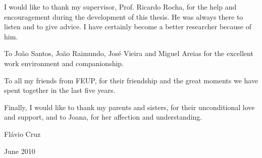 I would like to thank my supervisor, Prof. Ricardo Rocha, for the help and encouragement during
the development of this thesis. He was always there to listen and to give advice. I have
certainly become a better researcher because of him.

To João Santos, João Raimundo, José Vieira and Miguel Areias for the excellent work environment
and companionship.

To all my friends from FEUP, for their friendship and the great moments we have spent together in
the last five years. 

Finally, I would like to thank my parents and sisters, for their unconditional love and support,
and to Joana, for her affection and understanding.

\begin{flushright}
   Flávio Cruz
   
   June 2010
\end{flushright}